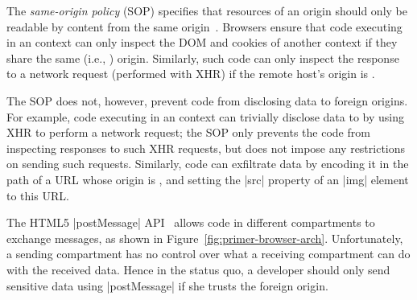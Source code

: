 The {\em same-origin policy} (SOP) specifies that resources of an
origin should only be readable by content from the same
origin~\cite{rfc6454, googlehandbook, VanKesteren2012}.  Browsers
ensure that code executing in an  context can only
inspect the DOM and cookies of another context if they share the same
(i.e., ) origin. Similarly, such code can only inspect
the response to a network request (performed with XHR) if the remote
host's origin is .
%
 
The SOP does not, however, prevent code from disclosing data to
foreign origins. For example, code executing in an 
context can trivially disclose data to  by using XHR to
perform a network request; the SOP only prevents the code from
inspecting responses to such XHR requests, but does not impose any
restrictions on sending such requests.
Similarly, code can exfiltrate data by encoding it in the path of a
URL whose origin is , and setting the \js|src| property
of an \js|img| element to this URL.


The HTML5 \js|postMessage| API~\cite{webmessaging}
allows code in different compartments to exchange
messages, as shown in Figure~\ref{fig:primer-browser-arch}.
%
%
Unfortunately, a sending compartment has no control over what a
receiving compartment can do with the received data. Hence in the
status quo, a developer should only send sensitive data using
\js|postMessage| if she trusts the foreign origin.
%

